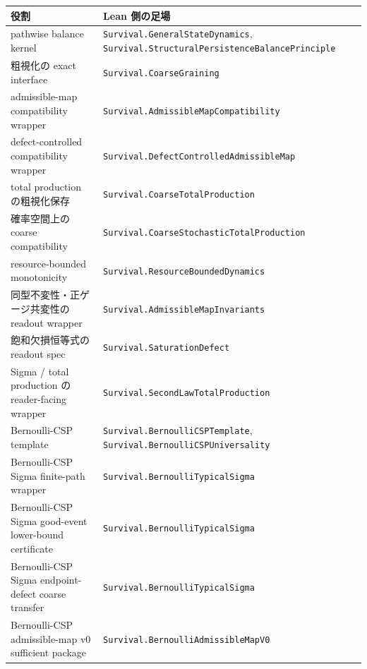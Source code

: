 \documentclass[12pt,a4paper]{article}
\begin{document}
{\def\LTcaptype{table} %
\begin{longtable}[]{@{}
  >{\raggedright\arraybackslash}p{}
  >{\raggedright\arraybackslash}p{}@{}}
\toprule\noalign{}
\begin{minipage}[b]{\linewidth}\raggedright
役割
\end{minipage} & \begin{minipage}[b]{\linewidth}\raggedright
Lean 側の足場
\end{minipage} \\
\midrule\noalign{}
\endhead
\bottomrule\noalign{}
\endlastfoot
pathwise balance kernel & \texttt{Survival.GeneralStateDynamics}, \texttt{Survival.StructuralPersistenceBalancePrinciple} \\
粗視化の exact interface & \texttt{Survival.CoarseGraining} \\
admissible-map compatibility wrapper & \texttt{Survival.AdmissibleMapCompatibility} \\
defect-controlled compatibility wrapper & \texttt{Survival.DefectControlledAdmissibleMap} \\
total production の粗視化保存 & \texttt{Survival.CoarseTotalProduction} \\
確率空間上の coarse compatibility & \texttt{Survival.CoarseStochasticTotalProduction} \\
resource-bounded monotonicity & \texttt{Survival.ResourceBoundedDynamics} \\
同型不変性・正ゲージ共変性の readout wrapper & \texttt{Survival.AdmissibleMapInvariants} \\
飽和欠損恒等式の readout spec & \texttt{Survival.SaturationDefect} \\
Sigma / total production の reader-facing wrapper & \texttt{Survival.SecondLawTotalProduction} \\
Bernoulli-CSP template & \texttt{Survival.BernoulliCSPTemplate}, \texttt{Survival.BernoulliCSPUniversality} \\
Bernoulli-CSP Sigma finite-path wrapper & \texttt{Survival.BernoulliTypicalSigma} \\
Bernoulli-CSP Sigma good-event lower-bound certificate & \texttt{Survival.BernoulliTypicalSigma} \\
Bernoulli-CSP Sigma endpoint-defect coarse transfer & \texttt{Survival.BernoulliTypicalSigma} \\
Bernoulli-CSP admissible-map v0 sufficient package & \texttt{Survival.BernoulliAdmissibleMapV0} \\

\end{longtable}}
\end{document}
